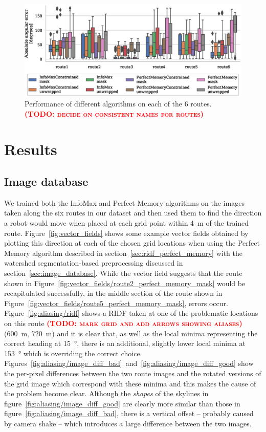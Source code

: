 \documentclass[letterpaper]{article}
\newcommand{\todo}[1]{\textbf{\textsc{\textcolor{red}{(TODO: #1)}}}}
\begin{document}
\begin{figure}[t]
    \centering
    \includegraphics{figures/route_benchmark.eps}
    \caption{Performance of different algorithms on each of the 6 routes. \todo{decide on consistent names for routes}}
    \label{fig:route_benchmark}
\end{figure}

\section{Results}
\subsection{Image database}
We trained both the InfoMax and Perfect Memory algorithms on the images taken along the six routes in our dataset and then used them to find the direction a robot would move when placed at each grid point within \SI{4}{\metre} of the trained route. 
Figure~\ref{fig:vector_fields} shows some example vector fields obtained by plotting this direction at each of the chosen grid locations when using the Perfect Memory algorithm described in section~\ref{sec:ridf_perfect_memory} with the watershed segmentation-based preprocessing discussed in section~\ref{sec:image_database}. 
While the vector field suggests that the route shown in Figure~\ref{fig:vector_fields/route2_perfect_memory_mask} would be recapitulated successfully, in the middle section of the route shown in Figure~\ref{fig:vector_fields/route5_perfect_memory_mask}, errors occur.
Figure~\ref{fig:aliasing/ridf} shows a RIDF taken at one of the problematic locations on this route \todo{mark grid and add arrows showing aliases} (\SI{600}{\metre}, \SI{720}{\metre}) and it is clear that, as well as the local minima representing the correct heading at \SI{15}{\degree}, there is an additional, slightly lower local minima at \SI{153}{\degree} which is overriding the correct choice.
Figures~\ref{fig:aliasing/image_diff_bad}~and~\ref{fig:aliasing/image_diff_good} show the per-pixel differences between the two route images and the rotated versions of the grid image which correspond with these minima and this makes the cause of the problem become clear.
Although the \emph{shapes} of the skylines in figure~\ref{fig:aliasing/image_diff_good} are clearly more similar than those in figure~\ref{fig:aliasing/image_diff_bad}, there is a vertical offset -- probably caused by camera shake -- which introduces a large difference between the two images.
\end{document}
